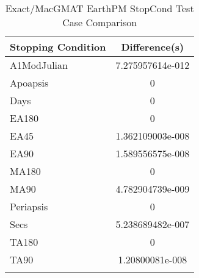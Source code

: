 \begin{table}[htbp!]
\centering
\caption{ Exact/MacGMAT EarthPM StopCond Test Case Comparison}
      \begin{tabular}{lc}
      \hline\hline
          Stopping Condition & Difference(s) \\
         \hline
         A1ModJulian & 7.275957614e-012 \\
         Apoapsis & 0 \\
         Days & 0 \\
         EA180 & 0 \\
         EA45 & 1.362109003e-008 \\
         EA90 & 1.589556575e-008 \\
         MA180 & 0 \\
         MA90 & 4.782904739e-009 \\
         Periapsis & 0 \\
         Secs & 5.238689482e-007 \\
         TA180 & 0 \\
         TA90 & 1.20800081e-008 \\
      \hline\hline
      \label{Table: Exact-MacGMAT EarthPM StopCond Table} 
\end{tabular}
\end{table}
